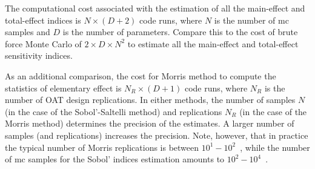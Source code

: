 The computational cost associated with the estimation of all the main-effect and total-effect indices is $N \times (D + 2)$ code runs,
where $N$ is the number of \gls{mc} samples and $D$ is the number of parameters.
Compare this to the cost of brute force Monte Carlo of $2 \times D \times N^2$ to estimate all the main-effect and total-effect sensitivity indices. 

As an additional comparison, the cost for Morris method to compute the statistics of elementary effect is $N_R \times (D + 1)$ code runs,
where $N_R$ is the number of OAT design replications.
In either methods, the number of samples $N$ (in the case of the Sobol'-Saltelli method) and replications $N_R$ (in the case of the Morris method)
determines the precision of the estimates.
A larger number of samples (and replications) increases the precision.
Note, however, that in practice the typical number of Morris replications is between $10^1 - 10^2$~\cite{Saltelli2010}, 
while the number of \gls{mc} samples for the Sobol' indices estimation amounts to $10^2 - 10^4$~\cite{Sobol2001}.
